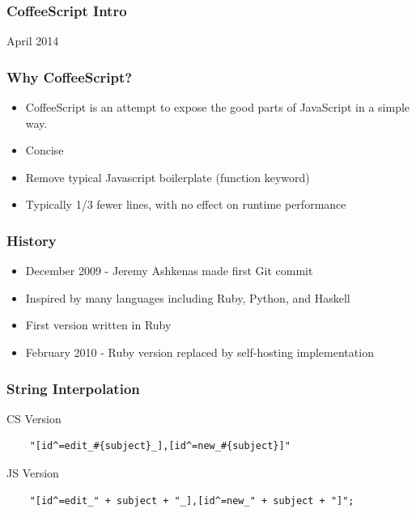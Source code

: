 \documentclass{beamer}
\begin{document}
\begin{frame}
  \frametitle{CoffeeScript Intro}

  April 2014

\end{frame}

\begin{frame}
  \frametitle{Why CoffeeScript?}
  \begin{itemize}
    \pause
    \item CoffeeScript is an attempt to expose the good parts of
      JavaScript in a simple way.
      \pause
    \item Concise
      \pause
    \item Remove typical Javascript boilerplate (function keyword)
      \pause
    \item  Typically 1/3 fewer lines, with no effect on runtime performance
  \end{itemize}
\end{frame}

\begin{frame}
  \frametitle{History}
  \begin{itemize}
    \item December 2009 - Jeremy Ashkenas made first Git commit
    \pause
    \item Inspired by many languages including Ruby, Python, and Haskell
      \pause
    \item First version written in Ruby
      \pause
    \item February 2010 - Ruby version replaced by self-hosting implementation
  \end{itemize}  
\end{frame}

\begin{frame}[fragile]
  \frametitle{String Interpolation}
  CS Version
  \begin{verbatim}
    "[id^=edit_#{subject}_],[id^=new_#{subject}]"
  \end{verbatim}
  JS Version
  \begin{verbatim}
    "[id^=edit_" + subject + "_],[id^=new_" + subject + "]";
  \end{verbatim}
  
\end{frame}
\end{document}

